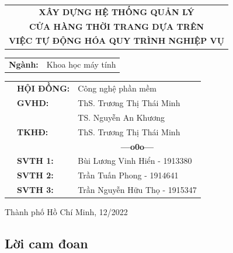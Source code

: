 \documentclass[a4paper, oneside, 13pt]{report}
\theoremstyle{definition}
\newcommand{\setupfont}[1]{\fontsize{#1}{#1}\selectfont}
\begin{document}
\begin{titlepage}
\vspace*{0.5cm}

\begin{center}
\setupfont{17pt}
	\begin{tabular}{c}
	\textbf{{XÂY DỰNG HỆ THỐNG QUẢN LÝ}}\\
	\textbf{{CỬA HÀNG THỜI TRANG DỰA TRÊN}}\\
	\textbf{{VIỆC TỰ ĐỘNG HÓA QUY TRÌNH NGHIỆP VỤ}}
	\end{tabular}
\end{center}

\vspace{0.5cm}


\begin{center}
	\setupfont{14pt}
	\begin{tabular}{rl}
		\textbf{Ngành:} & Khoa học máy tính
	\end{tabular}
\end{center}

\vspace{1cm}

\begin{table}[h]
	\setupfont{13pt}
\begin{tabular}{rll}
\hspace{5 cm}	& \textbf{HỘI ĐỒNG:} 	& Công nghệ phần mềm  \\
				& \textbf{GVHD:} 		& ThS. Trương Thị Thái Minh\\
				&						& TS. Nguyễn An Khương\\
				& \textbf{TKHĐ:}		& ThS. Trương Thị Thái Minh\\
				&&\multicolumn{1}{c}{\bf---o0o---}\vspace{2mm}\\
				& \textbf{SVTH 1:} 		& Bùi Lương Vinh Hiển - 1913380       \\
				& \textbf{SVTH 2:} 		& Trần Tuấn Phong - 1914641       \\
				& \textbf{SVTH 3:} 		& Trần Nguyễn Hữu Thọ - 1915347       \\
\end{tabular}
\end{table}

\begin{center}
{\setupfont{12pt} Thành phố Hồ Chí Minh, 12/2022}
\end{center}
\end{titlepage}


\newpage
\newpage
\setlength{\parskip}{2.5mm}
\thispagestyle{plain}
	\begin{center}
		\section*{Lời cam đoan}
	\end{center}
	
\end{document}

